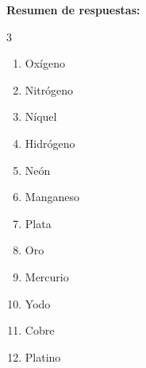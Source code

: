\begin{exercise}
\begin{solu}
        \textbf{Resumen de respuestas:}
        \begin{multicols}{3}
            \begin{enumerate}[label=\letraminuscula]
                \item Oxígeno
                \item Nitrógeno
                \item Níquel
                \item Hidrógeno
                \item Neón
                \item Manganeso
                \item Plata
                \item Oro
                \item Mercurio
                \item Yodo
                \item Cobre
                \item Platino
            \end{enumerate}
        \end{multicols}
    \end{solu}
\end{exercise}

